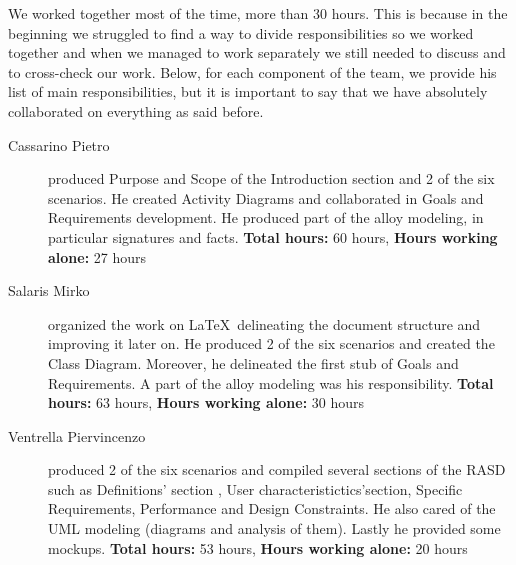We worked together most of the time, more than 30 hours. This is because in the beginning we struggled to find a way to divide responsibilities so we worked together and when we managed to work separately we still needed to discuss and to cross-check our work.\newline
Below, for each component of the team, we provide his list of main responsibilities, but it is important to say that we have absolutely collaborated on everything as said before.

\begin{description}
	\item[Cassarino Pietro] produced Purpose and Scope of the Introduction section and 2 of the six scenarios. He created Activity Diagrams and collaborated in Goals and Requirements development. He produced part of the alloy modeling, in particular signatures and facts. \newline
	\textbf{Total hours:} 60 hours, \textbf{Hours working alone:} 27 hours
	\item[Salaris Mirko] organized the work on \LaTeX\ delineating the document structure and improving it later on. He produced 2 of the six scenarios and created the Class Diagram. Moreover, he delineated the first stub of Goals and Requirements. A part of the alloy modeling was his responsibility.\newline
	\textbf{Total hours:} 63 hours, \textbf{Hours working alone:} 30 hours
	\item[Ventrella Piervincenzo] produced 2 of the six scenarios and compiled several sections of the RASD such as Definitions' section , User characteristictics'section, Specific Requirements, Performance and Design Constraints. He also cared of the UML modeling (diagrams and analysis of them). Lastly he provided some mockups. \newline
	\textbf{Total hours:} 53 hours, \textbf{Hours working alone:} 20 hours
\end{description}